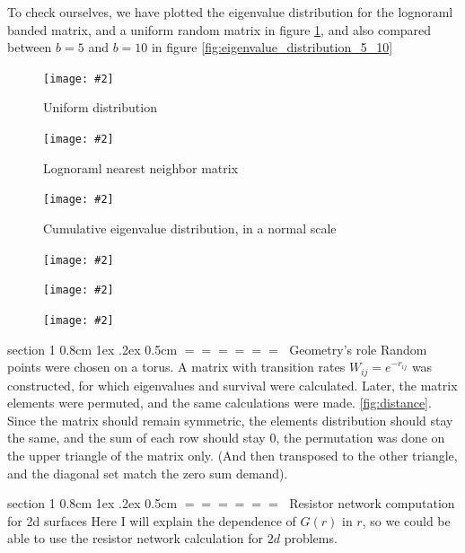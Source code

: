 \documentclass[onecolumn,fleqn,notitlepage,secnumarabic]{revtex4}
\makeatletter
\def\section{%
  \@startsection
    {section}%
    {1}%
    {\z@}%
    {0.8cm \@plus1ex \@minus .2ex}%
    {0.5cm}%
    {\Large\bf $=\!=\!=\!=\!=\!=\;$}%
}%
\newcommand{\dontincludegraphics}[2][]{\texttt{[image: \#2]}}
\makeatother
\begin{document}
To check ourselves, we have plotted the eigenvalue distribution for the lognoraml banded matrix, and a uniform random matrix in figure \ref{fig:eigenvalue_distribution}, and also compared between $b=5$ and $b=10$ in figure \ref{fig:eigenvalue_distribution_5_10}
\begin{figure}[H]
    {\dontincludegraphics[clip, width=0.9\hsize]{eigvals_uniform}}
\caption{Uniform distribution}
    \label{fig:eigenvalue_distribution}
\end{figure}
\begin{figure}[H]
    {\dontincludegraphics[clip, width=0.9\hsize]{eigvals_lognormal_loglog}}
    \caption{Lognoraml nearest neighbor matrix}

\end{figure}
\begin{figure}[H]
    \dontincludegraphics[clip,width=0.9\hsize]{eigvals_lognormal_normal}
    \caption{Cumulative eigenvalue distribution, in a normal scale}
\end{figure}
\begin{figure}[H]
    \dontincludegraphics[clip, width=0.9\hsize]{eigvals_ones_loglog}
\end{figure}
\begin{figure}[H]
    \dontincludegraphics[clip, width=0.9\hsize]{eigvals_alter_loglog}
\end{figure}
\begin{figure}[H]
    \dontincludegraphics[clip, width=0.9\hsize]{eigvals_box_loglog}
\end{figure}

\section{Geometry's role} \label{sec:geometry}
Random points were chosen on a torus. A matrix with transition rates $W_{ij} = e^{-r_{ij}}$ was constructed, for which eigenvalues and survival were calculated. Later, the matrix elements were permuted, and the same calculations were made. \ref{fig:distance}. Since the matrix should remain symmetric, the elements distribution should stay the same, and the sum of each row should stay $0$, the permutation was done on the upper triangle of the matrix only. (And then transposed to the other triangle, and the diagonal set match the zero sum demand).

\section{Resistor network computation for 2d surfaces}
Here I will explain the dependence of $G(r)$ in $r$, so we could be able to use the resistor network calculation for $2d$ problems.
\end{document}
